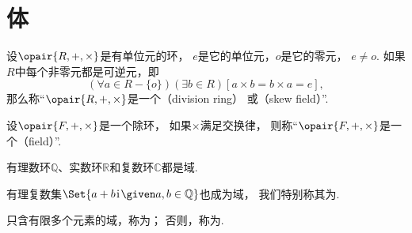 \section{体}
\begin{definition}
设\(\opair{R,+,\times}\)是有单位元的环，
\(e\)是它的单位元，\(o\)是它的零元，
\(e \neq o\).
如果\(R\)中每个非零元都是可逆元，即\[
	(\forall a \in R-\{o\})(\exists b \in R)[a \times b = b \times a = e],
\]
那么称“\(\opair{R,+,\times}\)是一个（division ring）
或（skew field）”.
\end{definition}

\begin{definition}
设\(\opair{F,+,\times}\)是一个除环，
如果\(\times\)满足交换律，
则称“\(\opair{F,+,\times}\)是一个（field）”.
\end{definition}

有理数环\(\mathbb{Q}\)、实数环\(\mathbb{R}\)和复数环\(\mathbb{C}\)都是域.

有理复数集\(\Set{ a+b\iu \given a,b\in\mathbb{Q} }\)也成为域，
我们特别称其为.

只含有限多个元素的域，称为；
否则，称为.
